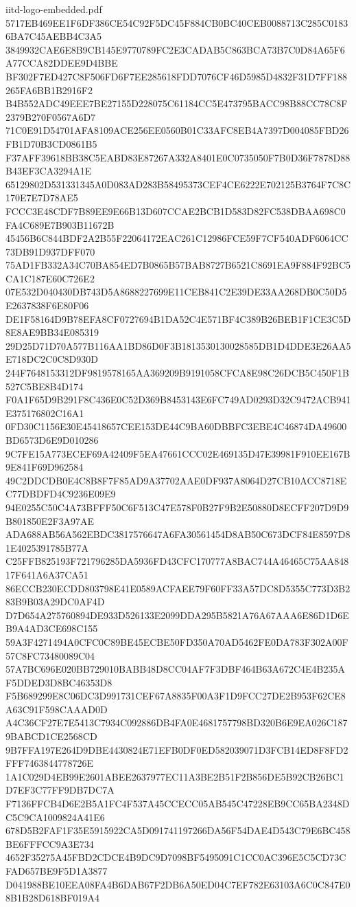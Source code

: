 \begin{filecontents*}[overwrite]{iitd-logo-embedded.pdf}
5717EB469EE1F6DF386CE54C92F5DC45F884CB0BC40CEB0088713C285C01836BA7C45AEBB4C3A5
3849932CAE6E8B9CB145E9770789FC2E3CADAB5C863BCA73B7C0D84A65F6A77CCA82DDEE9D4BBE
BF302F7ED427C8F506FD6F7EE285618FDD7076CF46D5985D4832F31D7FF188265FA6BB1B2916F2
B4B552ADC49EEE7BE27155D228075C61184CC5E473795BACC98B88CC78C8F2379B270F0567A6D7
71C0E91D54701AFA8109ACE256EE0560B01C33AFC8EB4A7397D004085FBD26FB1D70B3CD0861B5
F37AFF39618BB38C5EABD83E87267A332A8401E0C0735050F7B0D36F7878D88B43EF3CA3294A1E
65129802D531331345A0D083AD283B58495373CEF4CE6222E702125B3764F7C8C170E7E7D78AE5
FCCC3E48CDF7B89EE9E66B13D607CCAE2BCB1D583D82FC538DBAA698C0FA4C689E7B903B11672B
45456B6C844BDF2A2B55F22064172EAC261C12986FCE59F7CF540ADF6064CC73DB91D937DFF070
75AD1FB332A34C70BA854ED7B0865B57BAB8727B6521C8691EA9F884F92BC5CA1C187E60C726E2
07E532D040430DB743D5A8688227699E11CEB841C2E39DE33AA268DB0C50D5E2637838F6E80F06
DE1F58164D9B78EFA8CF0727694B1DA52C4E571BF4C389B26BEB1F1CE3C5D8E8AE9BB34E085319
29D25D71D70A577B116AA1BD86D0F3B1813530130028585DB1D4DDE3E26AA5E718DC2C0C8D930D
244F7648153312DF9819578165AA369209B9191058CFCA8E98C26DCB5C450F1B527C5BE8B4D174
F0A1F65D9B291F8C436E0C52D369B8453143E6FC749AD0293D32C9472ACB941E375176802C16A1
0FD30C1156E30E45418657CEE153DE44C9BA60DBBFC3EBE4C46874DA49600BD6573D6E9D010286
9C7FE15A773ECEF69A42409F5EA47661CCC02E469135D47E39981F910EE167B9E841F69D962584
49C2DDCDB0E4C8B8F7F85AD9A37702AAE0DF937A8064D27CB10ACC8718EC77DBDFD4C9236E09E9
94E0255C50C4A73BFFF50C6F513C47E578F0B27F9B2E50880D8ECFF207D9D9B801850E2F3A97AE
ADA688AB56A562EBDC3817576647A6FA30561454D8AB50C673DCF84E8597D81E4025391785B77A
C25FFB825193F721796285DA5936FD43CFC170777A8BAC744A46465C75AA84817F641A6A37CA51
86ECCB230ECDD803798E41E0589ACFAEE79F60FF33A57DC8D5355C773D3B283B9B03A29DC0AF4D
D7D654A275760894DE933D526133E2099DDA295B5821A76A67AAA6E86D1D6EB9A4AD3CE698C155
59A3F4271494A0CFC0C89BE45ECBE50FD350A70AD5462FE0DA783F302A00F57C8FC73480089C04
57A7BC696E020BB729010BABB48D8CC04AF7F3DBF464B63A672C4E4B235AF5DDED3D8BC46353D8
F5B689299E8C06DC3D991731CEF67A8835F00A3F1D9FCC27DE2B953F62CE8A63C91F598CAAAD0D
A4C36CF27E7E5413C7934C092886DB4FA0E4681757798BD320B6E9EA026C1879BABCD1CE2568CD
9B7FFA197E264D9DBE4430824E71EFB0DF0ED582039071D3FCB14ED8F8FD2FFF7463844778726E
1A1C029D4EB99E2601ABEE2637977EC11A3BE2B51F2B856DE5B92CB26BC1D7EF3C77FF9DB7DC7A
F7136FFCB4D6E2B5A1FC4F537A45CCECC05AB545C47228EB9CC65BA2348DC5C9CA1009824A41E6
678D5B2FAF1F35E5915922CA5D091741197266DA56F54DAE4D543C79E6BC458BE6FFFCC9A3E734
4652F35275A45FBD2CDCE4B9DC9D7098BF5495091C1CC0AC396E5C5CD73CFAD657BE9F5D1A3877
D041988BE10EEA08FA4B6DAB67F2DB6A50ED04C7EF782E63103A6C0C847E08B1B28D618BF019A4

\end{filecontents*}
